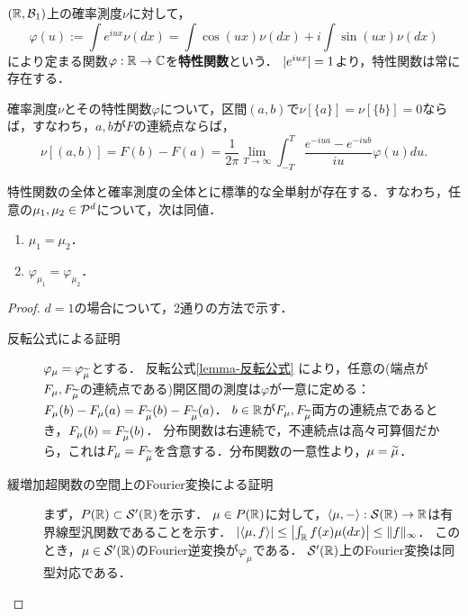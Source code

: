 \documentclass[uplatex,dvipdfmx]{jsreport}
\begin{document}
\begin{definition}
    $(\R,\B_1)$上の確率測度$\nu$に対して，
    \[\varphi(u):=\int e^{iux}\nu(dx)=\int\cos(ux)\nu(dx)+i\int\sin(ux)\nu(dx)\]
    により定まる関数$\varphi:\R\to\C$を\textbf{特性関数}という．
    $\abs{e^{iux}}=1$より，特性関数は常に存在する．
\end{definition}

\begin{lemma}\label{lemma-反転公式}
    確率測度$\nu$とその特性関数$\varphi$について，区間$(a,b)$で$\nu[\{a\}]=\nu[\{b\}]=0$ならば，すなわち，$a,b$が$F$の連続点ならば，
    \[\nu[(a,b)]=F(b)-F(a)=\frac{1}{2\pi}\lim_{T\to\infty}\int^T_{-T}\frac{e^{-iua}-e^{-iub}}{iu}\varphi(u)du.\]
\end{lemma}

\begin{theorem}[一意性定理]
    特性関数の全体と確率測度の全体とに標準的な全単射が存在する．すなわち，任意の$\mu_1,\mu_2\in\P^d$について，次は同値．
    \begin{enumerate}
        \item $\mu_1=\mu_2$．
        \item $\varphi_{\mu_1}=\varphi_{\mu_2}$．
    \end{enumerate}
\end{theorem}
\begin{proof}
    $d=1$の場合について，2通りの方法で示す．
    \begin{description}
        \item[反転公式による証明] 
        $\varphi_\mu=\varphi_{\wt{\mu}}$とする．
        反転公式\ref{lemma-反転公式}
        により，任意の(端点が$F_\mu,F_{\wt{\mu}}$の連続点である)開区間の測度は$\varphi$が一意に定める：$F_\mu(b)-F_\mu(a)=F_{\wt{\mu}}(b)-F_{\wt{\mu}}(a)$．
        $b\in\R$が$F_\mu,F_{\wt{\mu}}$両方の連続点であるとき，$F_\mu(b)=F_{\wt{\mu}}(b)$．
        分布関数は右連続で，不連続点は高々可算個だから，これは$F_\mu=F_{\wt{\mu}}$を含意する．分布関数の一意性より，$\mu=\wt{\mu}$．
        \item[緩増加超関数の空間上のFourier変換による証明]
        まず，$P(\R)\subset\cS'(\R)$を示す．
        $\mu\in P(\R)$に対して，$\brac{\mu,-}:\cS(\R)\to\R$は有界線型汎関数であることを示す．
        $\abs{\brac{\mu,f}}\le\Abs{\int_\R f(x)\mu(dx)}\le\norm{f}_\infty$．
        このとき，$\mu\in\cS'(\R)$のFourier逆変換が$\varphi_\mu$である．
        $\cS'(\R)$上のFourier変換は同型対応である．
    \end{description}
\end{proof}
\end{document}
